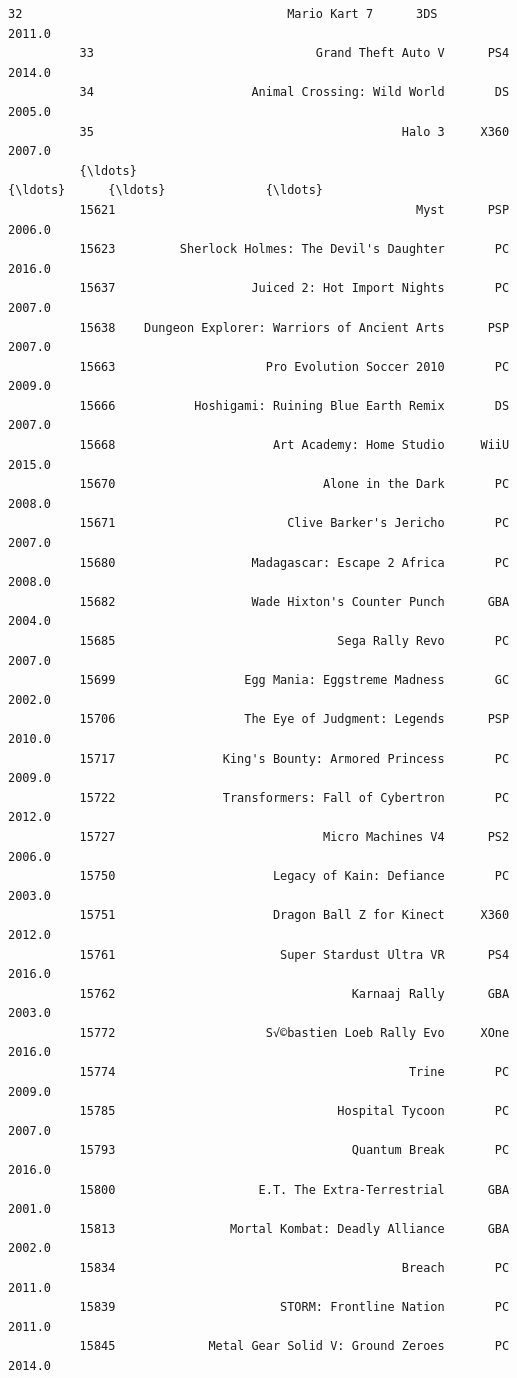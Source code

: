 \documentclass[11pt]{article}
\begin{document}
\begin{Verbatim}[commandchars=\\\{\}]
          32                                     Mario Kart 7      3DS           2011.0   
          33                               Grand Theft Auto V      PS4           2014.0   
          34                      Animal Crossing: Wild World       DS           2005.0   
          35                                           Halo 3     X360           2007.0   
          {\ldots}                                             {\ldots}      {\ldots}              {\ldots}   
          15621                                          Myst      PSP           2006.0   
          15623         Sherlock Holmes: The Devil's Daughter       PC           2016.0   
          15637                   Juiced 2: Hot Import Nights       PC           2007.0   
          15638    Dungeon Explorer: Warriors of Ancient Arts      PSP           2007.0   
          15663                     Pro Evolution Soccer 2010       PC           2009.0   
          15666           Hoshigami: Ruining Blue Earth Remix       DS           2007.0   
          15668                      Art Academy: Home Studio     WiiU           2015.0   
          15670                             Alone in the Dark       PC           2008.0   
          15671                        Clive Barker's Jericho       PC           2007.0   
          15680                   Madagascar: Escape 2 Africa       PC           2008.0   
          15682                   Wade Hixton's Counter Punch      GBA           2004.0   
          15685                               Sega Rally Revo       PC           2007.0   
          15699                  Egg Mania: Eggstreme Madness       GC           2002.0   
          15706                  The Eye of Judgment: Legends      PSP           2010.0   
          15717               King's Bounty: Armored Princess       PC           2009.0   
          15722               Transformers: Fall of Cybertron       PC           2012.0   
          15727                             Micro Machines V4      PS2           2006.0   
          15750                      Legacy of Kain: Defiance       PC           2003.0   
          15751                      Dragon Ball Z for Kinect     X360           2012.0   
          15761                       Super Stardust Ultra VR      PS4           2016.0   
          15762                                 Karnaaj Rally      GBA           2003.0   
          15772                     S√©bastien Loeb Rally Evo     XOne           2016.0   
          15774                                         Trine       PC           2009.0   
          15785                               Hospital Tycoon       PC           2007.0   
          15793                                 Quantum Break       PC           2016.0   
          15800                    E.T. The Extra-Terrestrial      GBA           2001.0   
          15813                Mortal Kombat: Deadly Alliance      GBA           2002.0   
          15834                                        Breach       PC           2011.0   
          15839                       STORM: Frontline Nation       PC           2011.0   
          15845             Metal Gear Solid V: Ground Zeroes       PC           2014.0   
          

\end{Verbatim}
\end{document}
